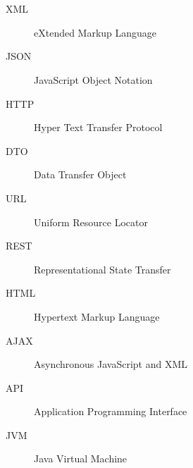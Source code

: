 \chapter*{\SeznamZkratek}

\begin{multicols}{2}
\raggedright
\begin{description}
\item [XML] eXtended Markup Language
\item [JSON] JavaScript Object Notation
\item [HTTP] Hyper Text Transfer Protocol
\item [DTO] Data Transfer Object
\item [URL] Uniform Resource Locator
\item [REST] Representational State Transfer
\item [HTML] Hypertext Markup Language
\item [AJAX] Asynchronous JavaScript and XML
\item [API] Application Programming Interface
\item [JVM] Java Virtual Machine
\end{description}
\end{multicols}


